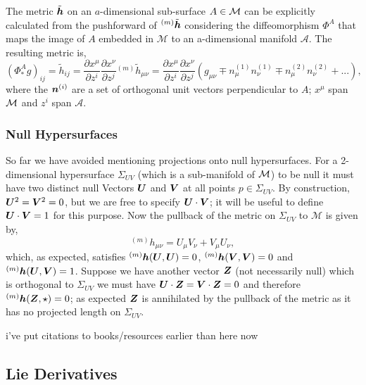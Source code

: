 The metric $\tilde{\boldsymbol{h}}$ on an $a$-dimensional sub-surface $A\in\mathcal{M}$ can be explicitly calculated from the pushforward of ${}^{(m)}\tilde{\boldsymbol{h}}$ considering the diffeomorphism $\Phi^A$ that maps the image of $A$ embedded in $\mathcal{M}$ to an a-dimensional manifold $\mathcal{A}$. The resulting metric is,
\begin{equation}
(\Phi^A_* g)_{ij} = \tilde{h}_{ij} = \frac{\partial x^\mu}{\partial z^i} \frac{\partial x^\nu}{\partial z^j} {}^{(m)}\tilde{h}_{\mu\nu}  = \frac{\partial x^\mu}{\partial z^i} \frac{\partial x^\nu}{\partial z^j}\left( g_{\mu\nu}\mp n^{(1)}_\mu n^{(1)}_\nu  \mp n^{(2)}_\mu n^{(2)}_\nu + ...  \right), \label{intro:eq:projectedmetric}
\end{equation}
where the $\boldsymbol{n}^{(i)}$ are a set of orthogonal unit vectors perpendicular to $A$; $x^\mu$ span $\mathcal{M}$ and $z^i$ span $\mathcal{A}$.


\color{orchid}
\subsubsection{Null Hypersurfaces}

So far we have avoided mentioning projections onto null hypersurfaces. For a 2-dimensional
hypersurface $\Sigma_{UV}$ (which is a sub-manifold of $\mathcal{M}$) to be null it must have two distinct null Vectors
$\boldsymbol{U}$ and $\boldsymbol{V}$ at all points $p \in \Sigma_{UV}$. By construction, $\boldsymbol{U}^2 = \boldsymbol{V}^2=0$,
but we are free to specify $\boldsymbol{U}\cdot \boldsymbol{V}$; it will be useful to define
$\boldsymbol{U}\cdot \boldsymbol{V} = 1$ for this purpose. Now the pullback of the metric on $\Sigma_{UV}$ to $\mathcal{M}$ is
given by,
\begin{equation}
{}^{(m)}h_{\mu\nu} =  U_\mu V_\nu + V_\mu U_\nu,
\end{equation}
which, as expected, satisfies ${}^{(m)}\boldsymbol{h}(\boldsymbol{U},\boldsymbol{U})=0$, ${}^{(m)}\boldsymbol{h}(\boldsymbol{V},\boldsymbol{V})=0$
and ${}^{(m)}\boldsymbol{h}(\boldsymbol{U},\boldsymbol{V})=1$. Suppose we have another vector $\boldsymbol{Z}$
(not necessarily null)
which is orthogonal to $\Sigma_{UV}$ we must have $\boldsymbol{U}\cdot \boldsymbol{Z} = \boldsymbol{V}\cdot \boldsymbol{Z} =0$
and therefore ${}^{(m)}\boldsymbol{h}(\boldsymbol{Z},\star)=0$; as expected $\boldsymbol{Z}$ is annihilated
by the pullback of the metric as it has no
projected length on $\Sigma_{UV}$.


\color{choral} i've put citations to books/resources earlier than here now \color{black}

\subsection{Lie Derivatives}\label{intro:sec:lie_deriv}

